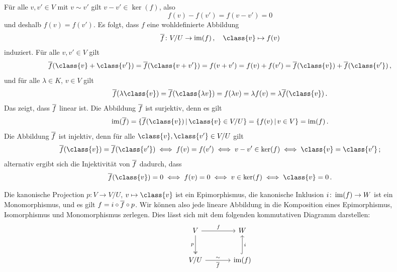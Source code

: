 \subsection{}

Für alle $v, v' \in V$ mit $v \sim v'$ gilt $v - v' \in \ker(f)$, also
\[
    f(v) - f(v')
  = f(v - v')
  = 0
\]
und deshalb $f(v) = f(v')$.
Es folgt, dass $f$ eine wohldefinierte Abbildung
\[
          \induced{f}
  \colon  V\!/U
  \to     \im(f) \,,
  \quad   \class{v}
  \mapsto f(v)
\]
induziert.
Für alle $v, v' \in V$ gilt
\[
    \induced{f}(\class{v} + \class{v'})
  = \induced{f}(\class{v + v'})
  = f(v + v')
  = f(v) + f(v')
  = \induced{f}(\class{v}) + \induced{f}(\class{v'}) \,,
\]
und für alle $\lambda \in K$, $v \in V$ gilt
\[
    \induced{f}(\lambda \class{v})
  = \induced{f}(\class{\lambda v})
  = f(\lambda v)
  = \lambda f(v)
  = \lambda \induced{f}(\class{v}) \,.
\]
Das zeigt, dass $\overline{f}$ linear ist.
Die Abbildung $\overline{f}$ ist surjektiv, denn es gilt
\[
    \im(\induced{f})
  = \{ \induced{f}(\class{v}) \suchthat \class{v} \in V\!/U \}
  = \{ f(v) \suchthat v \in V \}
  = \im(f) \,.
\]
Die Abbildung $\overline{f}$ ist injektiv, denn für alle $\class{v}, \class{v'} \in V\!/U$ gilt
\[
        \induced{f}(\class{v})  = \induced{f}(\class{v'})
  \iff  f(v)  = f(v')
  \iff  v - v' \in \ker(f)
  \iff  \class{v} = \class{v'} \,;
\]
alternativ ergibt sich die Injektivität von $\overline{f}$ dadurch, dass
\[
        \induced{f}(\class{v}) = 0
  \iff  f(v) = 0
  \iff  v \in \ker(f)
  \iff  \class{v} = 0 \,.
\]

\begin{remark}
  Die kanonische Projection $p \colon V \to V\!/U$, $v \mapsto \class{v}$ ist ein Epimorphismus, die kanonische Inklusion $i \colon \operatorname{im}(f) \to W$ ist ein Monomorphismus, und es gilt $f = i \circ \overline{f} \circ p$.
  Wir können also jede lineare Abbildung in die Komposition eines Epimorphismus, Isomorphismus und Monomorphismus zerlegen.
  Dies lässt sich mit dem folgenden kommutativen Diagramm darstellen:
  \[
    \begin{tikzcd}[sep = large]
        V
        \arrow{r}[above]{f}
        \arrow[twoheadrightarrow]{d}[left]{p}
      & W
      \\
        V\!/U
        \arrow{r}[above]{\sim}[below]{\induced{f}}
      & \im(f)
        \arrow[hook]{u}[right]{i}
    \end{tikzcd}
  \]
\end{remark}



